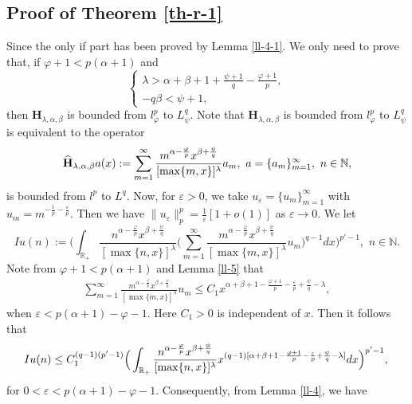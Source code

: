 \documentclass[10pt]{amsart}
\theoremstyle{definition}    %
\numberwithin{equation}{section}
\begin{document}
\subsection{{\bf Proof of Theorem \ref{th-r-1}}}
Since the only if part has been proved by Lemma \ref{ll-4-1}. We only need to prove that, if $\varphi+1<p(\alpha+1)$ and \begin{equation}\label{good-1}
\begin{cases}
\lambda>\alpha+\beta+1+\frac{\psi+1}{q}-\frac{\varphi+1}{p}, \\
-q\beta<\psi+1,  
\end{cases}
\end{equation}
then  $\mathbf{H}_{\lambda, \alpha, \beta}$ is bounded from $l_{\varphi}^{p}$ to $L_{\psi}^{q}$. Note that  $\mathbf{H}_{\lambda, \alpha, \beta}$ is bounded from $l_{\varphi}^{p}$ to $L_{\psi}^{q}$ is equivalent to the operator
$$\widehat{{\bf H}}_{\lambda, \alpha, \beta}a(x):=\sum_{m=1}^{\infty} \frac{m^{\alpha-\frac{\varphi}{p}}x^{\beta+\frac{\psi}{q}}}{[\max\{m,x\}]^{\lambda}}a_m,\,\, a=\{a_m\}_{m=1}^{\infty}, \,\, n\in \mathbb{N},$$
is bounded from $l^{p}$ to $L^{q}$. Now, for $\varepsilon>0$, we take $u_{\varepsilon}=\{u_m\}_{m=1}^{\infty}$ with $u_{m}=m^{-\frac{1}{p}-\frac{\varepsilon}{p}}$. Then we have $\|u_{\varepsilon}\|_{p}^p=\frac{1}{\varepsilon}[1+o(1)]$ as $\varepsilon \rightarrow 0$.
We let 
$$Iu(n):=\Big(\int_{\mathbb{R}_{+}}\frac{n^{\alpha-\frac{\varphi}{p}}x^{\beta+\frac{\psi}{q}}}{[\max\{n,x\}]^{\lambda}}\Big(\sum_{m=1}^{\infty}\frac{m^{\alpha-\frac{\varphi}{p}}x^{\beta+\frac{\psi}{q}}}{[\max\{m,x\}]^{\lambda}}u_m\Big)^{q-1}dx\Big)^{p'-1},\,\, n\in \mathbb{N}.$$
Note from $\varphi+1<p(\alpha+1)$ and Lemma \ref{ll-5} that 
\begin{eqnarray}
\sum_{m=1}^{\infty}\frac{m^{\alpha-\frac{\varphi}{p}}x^{\beta+\frac{\psi}{q}}}{[\max\{m,x\}]^{\lambda}}u_m\leq C_1x^{\alpha+\beta+1-\frac{\varphi+1}{p}-\frac{\varepsilon}{p}+\frac{\psi}{q}-\lambda},\nonumber 
\end{eqnarray}
when $\varepsilon<p(\alpha+1)-\varphi-1$. Here $C_1>0$ is independent of $x$. Then it follows that 
\begin{equation}
Iu(n)\leq C_1^{(q-1)(p'-1)}\Big(\int_{\mathbb{R}_{+}}\frac{n^{\alpha-\frac{\varphi}{p}}x^{\beta+\frac{\psi}{q}}}{[\max\{n,x\}]^{\lambda}}x^{(q-1)[\alpha+\beta+1-\frac{\varphi+1}{p}-\frac{\varepsilon}{p}+\frac{\psi}{q}-\lambda]}dx\Big)^{p'-1}, \nonumber\\
\end{equation}
for $0<\varepsilon<p(\alpha+1)-\varphi-1$. Consequently, from Lemma \ref{ll-4}, we have 
\end{document}

